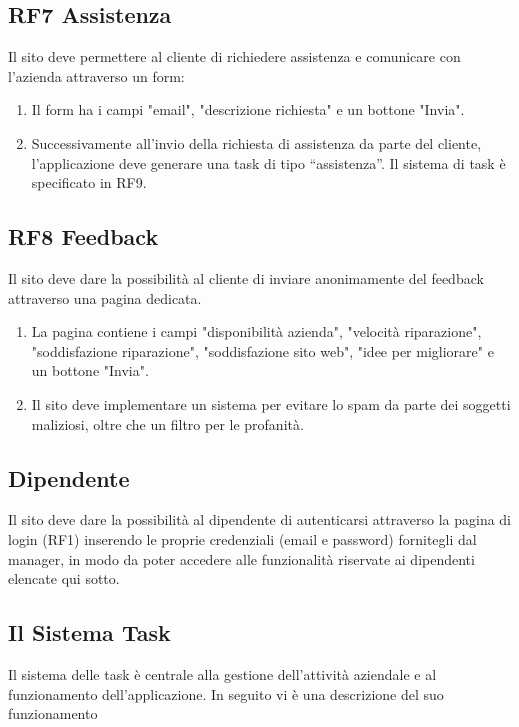 \documentclass{report}
\begin{document}
\subsection*{RF7 Assistenza}
Il sito deve permettere al cliente di richiedere assistenza e comunicare con l'azienda attraverso un form:

\begin{enumerate}
	\item Il form ha i campi "email", "descrizione richiesta" e un bottone "Invia".
	
	\item Successivamente all’invio della richiesta di assistenza da parte del cliente, l’applicazione deve generare una task di tipo “assistenza”. Il sistema di task è specificato in RF9.
	
	
\end{enumerate}

\subsection*{RF8 Feedback}
Il sito deve dare la possibilità al cliente di inviare anonimamente del feedback attraverso una pagina dedicata.
\begin{enumerate}
	\item La pagina contiene i campi "disponibilità azienda", "velocità riparazione", "soddisfazione riparazione", "soddisfazione sito web", "idee per migliorare" e un bottone "Invia".
	
	\item Il sito deve implementare un sistema per evitare lo spam da parte dei soggetti maliziosi, oltre che un filtro  per le profanità.
	
\end{enumerate}

\subsection{Dipendente}
Il sito deve dare la possibilità al dipendente di autenticarsi attraverso la pagina di login (RF1) inserendo le proprie credenziali (email e password) fornitegli dal manager, in modo da poter accedere alle funzionalità riservate ai dipendenti elencate qui sotto.

\subsection*{Il Sistema Task}
Il sistema delle task è centrale alla gestione dell'attività aziendale e al funzionamento dell'applicazione. In seguito vi è una descrizione del suo funzionamento
\end{document}
